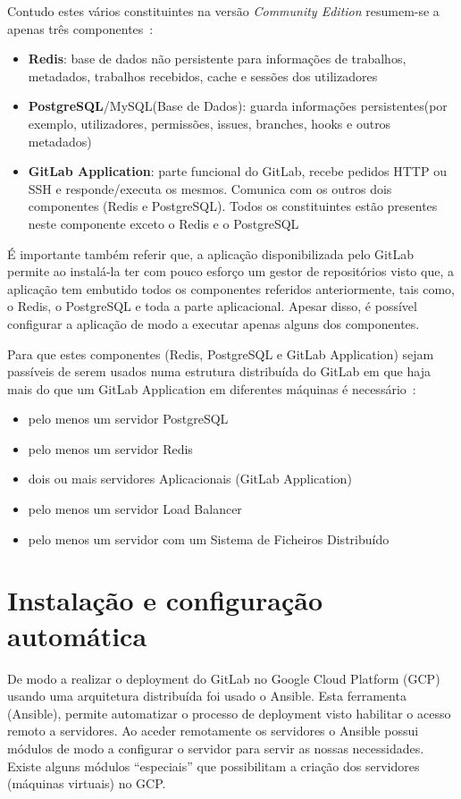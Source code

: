 \documentclass{article}
\begin{document}
Contudo estes vários constituintes na versão \textit{Community Edition} resumem-se a apenas três componentes~\cite{arch}:
\begin{itemize}
    \item \textbf{Redis}: base de dados não persistente para informações de trabalhos, metadados, trabalhos recebidos, cache e sessões dos utilizadores
    \item \textbf{PostgreSQL}/MySQL(Base de Dados): guarda informações persistentes(por exemplo, utilizadores, permissões, issues, branches, hooks e outros metadados)
    \item \textbf{GitLab Application}: parte funcional do GitLab, recebe pedidos HTTP ou SSH e responde/executa os mesmos. Comunica com os outros dois componentes (Redis e PostgreSQL). Todos os constituintes estão presentes neste componente exceto o Redis e o PostgreSQL
\end{itemize}

É importante também referir que, a aplicação disponibilizada pelo GitLab permite ao instalá-la ter com pouco esforço um gestor de repositórios visto que, a aplicação tem embutido todos os componentes referidos anteriormente, tais como, o Redis, o PostgreSQL e toda a parte aplicacional. Apesar disso, é possível configurar a aplicação de modo a executar apenas alguns dos componentes.

Para que estes componentes (Redis, PostgreSQL e GitLab Application) sejam passíveis de serem usados numa estrutura distribuída do GitLab em que haja mais do que um GitLab Application em diferentes máquinas é necessário~\cite{HA}:
\begin{itemize}
    \item pelo menos um servidor PostgreSQL
    \item pelo menos um servidor Redis
    \item dois ou mais servidores Aplicacionais (GitLab Application)
    \item pelo menos um servidor Load Balancer
    \item pelo menos um servidor com um Sistema de Ficheiros Distribuído
\end{itemize}

\section{Instalação e configuração automática} \label{Inst}
De modo a realizar o deployment do GitLab no Google Cloud Platform (GCP) usando uma arquitetura distribuída foi usado o Ansible. Esta ferramenta (Ansible), permite automatizar o processo de deployment visto habilitar o acesso remoto a servidores. Ao aceder remotamente os servidores o Ansible possui módulos de modo a configurar o servidor para servir as nossas necessidades. Existe alguns módulos ``especiais'' que possibilitam a criação dos servidores (máquinas virtuais) no GCP. 
\end{document}
